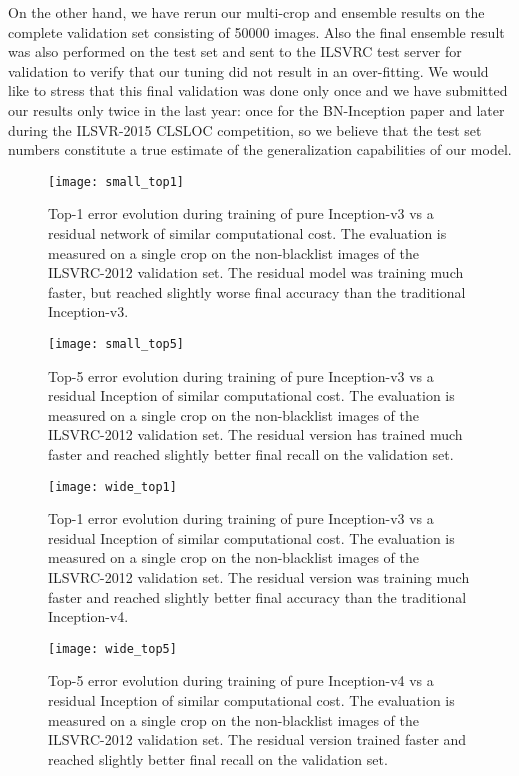 \documentclass[10pt,twocolumn,letterpaper]{article}
\begin{document}
On the other hand, we have rerun our multi-crop and ensemble results on the
complete validation set consisting of 50000 images. Also the final ensemble
result was also performed on the test set and sent to the ILSVRC test server
for validation to verify that our tuning did not result in an over-fitting.
We would like to stress that this final validation was done only once and we
have submitted our results only twice in the last year: once for the
BN-Inception paper and later during the ILSVR-2015 CLSLOC competition, so
we believe that the test set numbers constitute a true estimate of the
generalization capabilities of our model.

\begin{figure}
\centering
\texttt{[image: small\_top1]}
\caption{Top-1 error evolution during training of pure Inception-v3 vs a
  residual network of similar computational cost. The evaluation is measured on
  a single crop on the non-blacklist images of the ILSVRC-2012 validation set.
  The residual model was training much faster, but reached
  slightly worse final accuracy than the traditional Inception-v3.
}
\label{fig:smalltop1}
\end{figure}

\begin{figure}
\centering
\texttt{[image: small\_top5]}
\caption{Top-5 error evolution during training of pure Inception-v3 vs a
  residual Inception of similar computational cost. The evaluation is measured on
  a single crop on the non-blacklist images of the ILSVRC-2012 validation set.
  The residual version has trained much faster and reached slightly better final recall
  on the validation set.
}
\label{fig:smalltop5}
\end{figure}


\begin{figure}
\centering
\texttt{[image: wide\_top1]}
\caption{Top-1 error evolution during training of pure Inception-v3 vs a
  residual Inception of similar computational cost. The evaluation is measured on
  a single crop on the non-blacklist images of the ILSVRC-2012 validation set.
  The residual version was training much faster and reached
  slightly better final accuracy than the traditional Inception-v4.
}
\label{fig:widetop1}
\end{figure}

\begin{figure}
\centering
\texttt{[image: wide\_top5]}
\caption{Top-5 error evolution during training of pure Inception-v4 vs a
  residual Inception of similar computational cost. The evaluation is measured on
  a single crop on the non-blacklist images of the ILSVRC-2012 validation set.
  The residual version trained faster and reached slightly better final recall
  on the validation set.
}
\label{fig:widetop5}
\end{figure}
\end{document}
